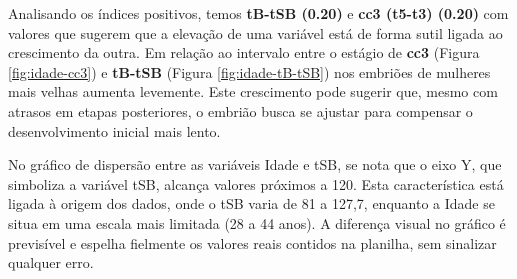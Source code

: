 Analisando os índices positivos, temos \textbf{tB-tSB (0.20)} e \textbf{cc3 (t5-t3) (0.20)} com valores que sugerem que a elevação de uma variável está de forma sutil ligada ao crescimento da outra. Em relação ao intervalo entre o estágio de \textbf{cc3} (Figura \ref{fig:idade-cc3}) e \textbf{tB-tSB} (Figura \ref{fig:idade-tB-tSB}) nos embriões de mulheres mais velhas aumenta levemente. Este crescimento pode sugerir que, mesmo com atrasos em etapas posteriores, o embrião busca se ajustar para compensar o desenvolvimento inicial mais lento.

No gráfico de dispersão entre as variáveis Idade e tSB, se nota que o eixo Y, que simboliza a variável tSB, alcança valores próximos a 120. Esta característica está ligada à origem dos dados, onde o tSB varia de 81 a 127,7, enquanto a Idade se situa em uma escala mais limitada (28 a 44 anos). A diferença visual no gráfico é previsível e espelha fielmente os valores reais contidos na planilha, sem sinalizar qualquer erro.

